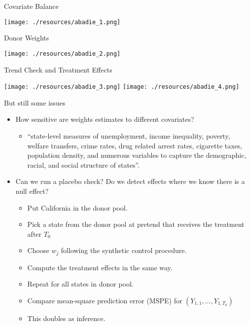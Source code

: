 \begin{frame}{Covariate Balance}
\begin{center}
\texttt{[image: ./resources/abadie\_1.png]}
\end{center}
\end{frame}

\begin{frame}{Donor Weights}
\begin{center}
\texttt{[image: ./resources/abadie\_2.png]}
\end{center}
\end{frame}

\begin{frame}{Trend Check and Treatment Effects}
\begin{center}
\texttt{[image: ./resources/abadie\_3.png]}
\texttt{[image: ./resources/abadie\_4.png]}
\end{center}
\end{frame}

\begin{frame}{But still some issues}
\begin{itemize}
\item How sensitive are weights estimates to different covariates?
\begin{itemize}
\item ``state-level measures of unemployment, income inequality, poverty, welfare transfers, crime rates, drug related arrest rates, cigarette taxes, population density, and numerous variables to capture the demographic, racial, and social structure of states''.
\end{itemize}
\item Can we run a \alert{placebo check}? Do we detect effects where we know there is a null effect?
\begin{itemize}
\item Put California in the donor pool.
\item Pick a state from the donor pool at pretend that receives the treatment after $T_0$
\item Choose $w_j$ following the synthetic control procedure.
\item Compute the treatment effects in the same way.
\item Repeat for all states in donor pool.
\item Compare \alert{mean-square prediction error} (MSPE) for $(Y_{1,1},\ldots,Y_{1,T_0})$
\item This doubles as \alert{inference}.
\end{itemize}
\end{itemize}
\end{frame}



